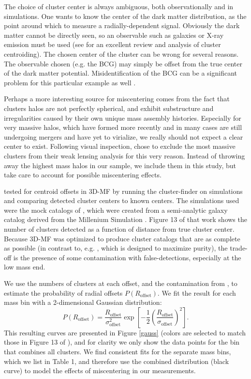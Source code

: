 The choice of cluster center is always ambiguous, both observationally and in simulations. One wants to know the center of the dark matter distribution, as the point around which to measure a radially-dependent signal. Obviously the dark matter cannot be directly seen, so an observable such as galaxies or X-ray emission must be used (see \citet{George12} for an excellent review and analysis of cluster centroiding). The chosen center of the cluster can be wrong for several reasons. The observable chosen (e.g. the BCG) may simply be offset from the true center of the dark matter potential. Misidentification of the BCG can be a significant problem for this particular example as well \citep{Johnston07}. 

Perhaps a more interesting source for miscentering comes from the fact that clusters halos are not perfectly spherical, and exhibit substructure and irregularities caused by their own unique mass assembly histories. Especially for very massive halos, which have formed more recently and in many cases are still undergoing mergers and have yet to virialize, we really should not expect a clear center to exist. Following visual inspection, \citet{Mandelbaum08b} chose to exclude the most massive clusters from their weak lensing analysis for this very reason. Instead of throwing away the highest mass halos in our sample, we include them in this study, but take care to account for possible miscentering effects. 

\citet{Milkeraitis10} tested for centroid offsets in 3D-MF by running the cluster-finder on simulations and comparing detected cluster centers to known centers. The simulations used were the mock catalogs of \citet{KW07}, which were created from a semi-analytic galaxy catalog \citep{DeLucia07} derived from the Millenium Simulation \citep{Springel05}. Figure 13 of that work shows the number of clusters detected as a function of distance from true cluster center. Because 3D-MF was optimized to produce cluster catalogs that are as complete as possible (in contrast to, e.g. \citet{Gillis11}, which is designed to maximize purity), the trade-off is the presence of some contamination with false-detections, especially at the low mass end.

We use the numbers of clusters at each offset, and the contamination from \citet{Milkeraitis10}, to estimate the probability of radial offsets $P(R_{\mathrm{offset}})$. We fit the result for each mass bin with a 2-dimensional Gaussian distribution:
\begin{equation}
P(R_{\mathrm{offset}}) = \frac{R_{\mathrm{offset}}}{\sigma_{\mathrm{offset}}^2} \exp \left[ -\frac{1}{2}\left( \frac{R_{\mathrm{offset}}}{\sigma_{\mathrm{offset}}} \right)^2 \right].
\label{PofRc}
\end{equation}
This resulting curves are presented in Figure \ref{gauss} (colors are selected to match those in Figure 13 of \citet{Milkeraitis10}), and for clarity we only show the data points for the bin that combines all clusters. We find consistent fits for the separate mass bins, which we list in Table 1, and therefore use the combined distribution (black curve) to model the effects of miscentering in our measurements.


